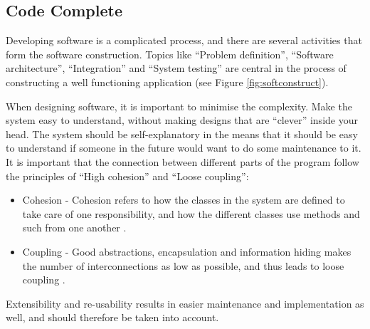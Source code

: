 \subsection{Code Complete}
\label{sec:softconstruct}
Developing software is a complicated process, and there are several activities that form the software construction. Topics like ``Problem definition'', ``Software architecture'', ``Integration'' and ``System testing'' are central in the process of constructing a well functioning application (see Figure \ref{fig:softconstruct}).


When designing software, it is important to minimise the complexity. Make the system easy to understand, without making designs that are ``clever'' inside your head. The system should be self-explanatory in the means that it should be easy to understand if someone in the future would want to do some maintenance to it. It is important that the connection between different parts of the program follow the principles of ``High cohesion'' and ``Loose coupling'':
\begin{itemize}
    \item Cohesion - Cohesion refers to how the classes in the system are defined to take care of one responsibility, and how the different classes use methods and such from one another \cite{adamcarlson}.
    \item Coupling - Good abstractions, encapsulation and information hiding makes the number of interconnections as low as possible, and thus leads to loose coupling \cite{adamcarlson}.
\end{itemize}
Extensibility and re-usability results in easier maintenance and implementation as well, and should therefore be taken into account. 

